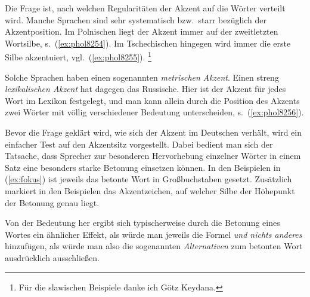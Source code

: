 
Die Frage ist, nach welchen Regularitäten der Akzent auf die Wörter verteilt wird.
Manche Sprachen sind sehr systematisch bzw.\ starr bezüglich der Akzentposition.
Im Polnischen liegt der Akzent immer auf der zweitletzten Wortsilbe, s.\ (\ref{ex:phol8254}).
Im Tschechischen hingegen wird immer die erste Silbe akzentuiert, vgl.\ (\ref{ex:phol8255}).%
\footnote{Für die slawischen Beispiele danke ich Götz Keydana.}

\begin{exe}
\end{exe}

Solche Sprachen haben einen sogenannten \textit{metrischen Akzent}.
Einen streng \textit{lexikalischen Akzent} hat dagegen das Russische.
Hier ist der Akzent für jedes Wort im Lexikon festgelegt, und man kann allein durch die Position des Akzents zwei Wörter mit völlig verschiedener Bedeutung unterscheiden, s.\ (\ref{ex:phol8256}).

\begin{exe}
\end{exe}

Bevor die Frage geklärt wird, wie sich der Akzent im Deutschen verhält, wird ein einfacher Test auf den Akzentsitz vorgestellt.
Dabei bedient man sich der Tatsache, dass Sprecher zur besonderen Hervorhebung einzelner Wörter in einem Satz eine besonders starke Betonung einsetzen können.
In den Beispielen in (\ref{ex:fokus}) ist jeweils das betonte Wort in Großbuchstaben gesetzt.
Zusätzlich markiert in den Beispielen das Akzentzeichen, auf welcher Silbe der Höhepunkt der Betonung genau liegt.

\begin{exe}
  \ex\label{ex:fokus}
  \begin{xlist}
  \end{xlist}
\end{exe}

Von der Bedeutung her ergibt sich typischerweise durch die Betonung eines Wortes ein ähnlicher Effekt, als würde man jeweils die Formel \textit{und nichts anderes} hinzufügen, als würde man also die sogenannten \textit{Alternativen} zum betonten Wort ausdrücklich ausschließen.

